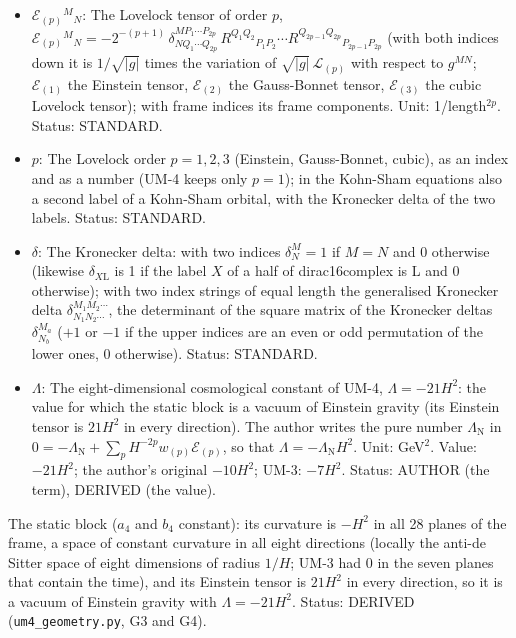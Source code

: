 \documentclass[
  10pt,
]{article}
\begin{document}
\begin{itemize}
  \(\kappa\lambda_{\mathrm{F}} = 12H\) of the fold; in UM-4 a free
  parameter, bounded from below by the propagation of the gauge fields
  in the bulk. Unit: GeV (1/length). Value: \(H > 2534\) GeV, about 2.5
  TeV (from the invisible width of the Z boson). Status: AUTHOR.
\item
  \(\mathcal{E}_{(p)}{}^M{}_N\): The Lovelock tensor of order \(p\),
  \(\mathcal{E}_{(p)}{}^M{}_N = -2^{-(p+1)}\,\delta^{MP_1\cdots P_{2p}}_{NQ_1\cdots Q_{2p}}\,R^{Q_1Q_2}{}_{P_1P_2}\cdots R^{Q_{2p-1}Q_{2p}}{}_{P_{2p-1}P_{2p}}\)
  (with both indices down it is \(1/\sqrt{\lvert g\rvert}\) times the
  variation of \(\sqrt{\lvert g\rvert}\,\mathcal{L}_{(p)}\) with respect
  to \(g^{MN}\); \(\mathcal{E}_{(1)}\) the Einstein tensor,
  \(\mathcal{E}_{(2)}\) the Gauss-Bonnet tensor, \(\mathcal{E}_{(3)}\)
  the cubic Lovelock tensor); with frame indices its frame components.
  Unit: 1/length\(^{2p}\). Status: STANDARD.
\item
  \(p\): The Lovelock order \(p = 1, 2, 3\) (Einstein, Gauss-Bonnet,
  cubic), as an index and as a number (UM-4 keeps only \(p = 1\)); in
  the Kohn-Sham equations also a second label of a Kohn-Sham orbital,
  with the Kronecker delta of the two labels. Status: STANDARD.
\item
  \(\delta\): The Kronecker delta: with two indices \(\delta^M_N = 1\)
  if \(M = N\) and 0 otherwise (likewise \(\delta_{X\mathrm{L}}\) is 1
  if the label \(X\) of a half of dirac16complex is L and 0 otherwise);
  with two index strings of equal length the generalised Kronecker delta
  \(\delta^{M_1M_2\cdots}_{N_1N_2\cdots}\), the determinant of the
  square matrix of the Kronecker deltas \(\delta^{M_a}_{N_b}\) (\(+1\)
  or \(-1\) if the upper indices are an even or odd permutation of the
  lower ones, 0 otherwise). Status: STANDARD.
\item
  \(\Lambda\): The eight-dimensional cosmological constant of UM-4,
  \(\Lambda = -21H^2\): the value for which the static block is a vacuum
  of Einstein gravity (its Einstein tensor is \(21H^2\) in every
  direction). The author writes the pure number \(\Lambda_{\mathrm{N}}\)
  in
  \(0 = -\Lambda_{\mathrm{N}} + \sum_p H^{-2p}w_{(p)}\mathcal{E}_{(p)}\),
  so that \(\Lambda = -\Lambda_{\mathrm{N}}H^2\). Unit: GeV\(^2\).
  Value: \(-21H^2\); the author's original \(-10H^2\); UM-3: \(-7H^2\).
  Status: AUTHOR (the term), DERIVED (the value).
\end{itemize}

The static block (\(a_4\) and \(b_4\) constant): its curvature is
\(-H^2\) in all 28 planes of the frame, a space of constant curvature in
all eight directions (locally the anti-de Sitter space of eight
dimensions of radius \(1/H\); UM-3 had 0 in the seven planes that
contain the time), and its Einstein tensor is \(21H^2\) in every
direction, so it is a vacuum of Einstein gravity with
\(\Lambda = -21H^2\). Status: DERIVED (\texttt{um4\_geometry.py}, G3 and
G4).
\end{document}
